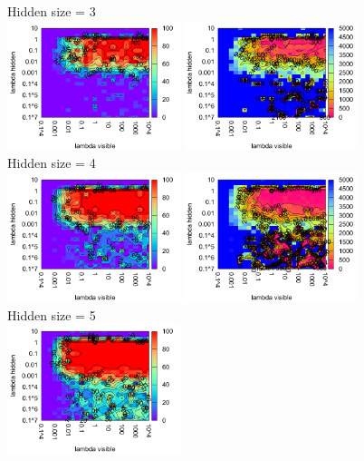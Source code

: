 \begin{figure}[H]
  \centering
  Hidden size = 3 \\
  \includegraphics[width=0.45\textwidth]{img/k3/tlr-3-success.pdf} 
  \includegraphics[width=0.45\textwidth]{img/k3/tlr-3-epoch.pdf}   
  Hidden size = 4 \\
  \includegraphics[width=0.45\textwidth]{img/k3/tlr-4-success.pdf} 
  \includegraphics[width=0.45\textwidth]{img/k3/tlr-4-epoch.pdf}   
  Hidden size = 5 \\
  \includegraphics[width=0.45\textwidth]{img/k3/tlr-5-success.pdf} 

\end{figure}
